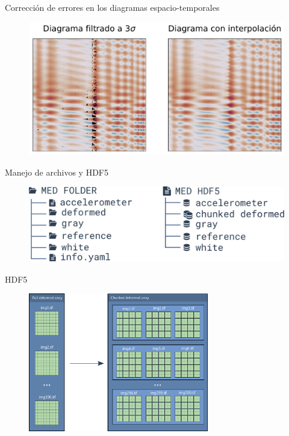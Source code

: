 \documentclass[aspectratio=169]{beamer}
\begin{document}
\begin{frame}{Corrección de errores en los diagramas espacio-temporales}
	\begin{figure}
		\includegraphics[width=0.8\linewidth]{figs/error_interp.pdf}
	\end{figure}
\end{frame}


\begin{frame}{Manejo de archivos y HDF5}
	\begin{figure}
		\centering
		\includegraphics[width=1\textwidth]{figs/med_folder_to_hdf5.pdf}
	\end{figure}
\end{frame}

\begin{frame}{HDF5}
	\begin{figure}[ht]
		\centering
		\includegraphics[width=0.7\textwidth]{figs/hdf5_chunk.pdf}
	\end{figure}
\end{frame}
\end{document}
